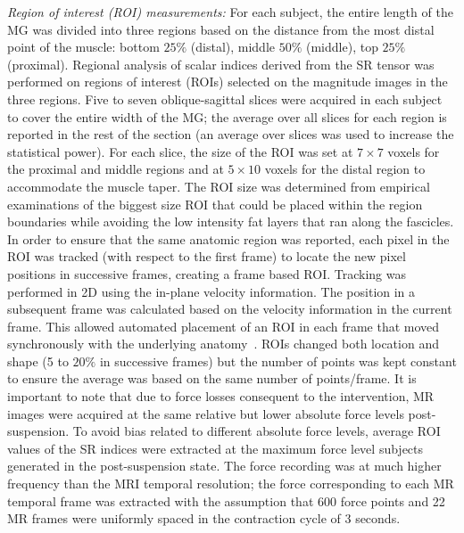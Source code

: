 \textit{Region of interest (ROI) measurements:}
For each subject, the entire length of the MG was divided into three regions based on the distance from the most distal point of the muscle: bottom $25\%$ (distal), middle $50\%$ (middle), top $25\%$ (proximal).
Regional analysis of scalar indices derived from the SR tensor was performed on regions of interest (ROIs) selected on the magnitude images in the three regions.
Five to seven oblique-sagittal slices were acquired in each subject to cover the entire width of the MG; the average over all slices for each region is reported in the rest of the section (an average over slices was used to increase the statistical power). 
For each slice, the size of the ROI was set at $7 \times 7$ voxels for the proximal and middle regions and at $5 \times 10$ voxels for the distal region to accommodate the muscle taper.
The ROI size was determined from empirical examinations of the biggest size ROI that could be placed within the region boundaries while avoiding the low intensity fat layers that ran along the fascicles.
In order to ensure that the same anatomic region was reported, each pixel in the ROI was tracked (with respect to the first frame) to locate the new pixel positions in successive frames, creating a frame based ROI. 
Tracking was performed in 2D using the in-plane velocity information. 
The position in a subsequent frame was calculated based on the velocity information in the current frame. 
This allowed automated placement of an ROI in each frame that moved synchronously with the underlying anatomy~\cite{RNS16}.
ROIs changed both location and shape (5 to $20\%$ in successive frames) but the number of points was kept constant to ensure the average was based on the same number of points/frame. 
It is important to note that due to force losses consequent to the intervention, MR images were acquired at the same relative but lower absolute force levels post-suspension. 
To avoid bias related to different absolute force levels, average ROI values of the SR indices were extracted at the maximum force level subjects generated in the post-suspension state. 
The force recording was at much higher frequency than the MRI temporal resolution; the force corresponding to each MR temporal frame was extracted with the assumption that 600 force points and 22 MR frames were uniformly spaced in the contraction cycle of 3 seconds.

